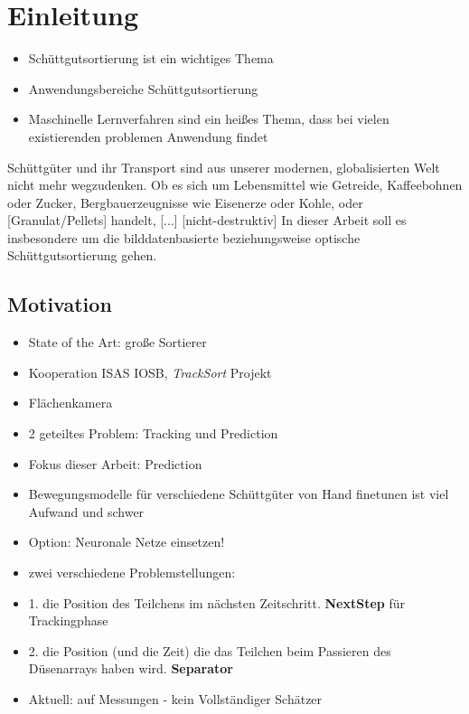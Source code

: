\chapter{Einleitung}

\begin{itemize}
    \item Schüttgutsortierung ist ein wichtiges Thema 
    \item Anwendungsbereiche Schüttgutsortierung
    \item Maschinelle Lernverfahren sind ein heißes Thema, dass bei vielen existierenden problemen Anwendung findet
\end{itemize}

Schüttgüter und ihr Transport sind aus unserer modernen, globalisierten Welt nicht mehr wegzudenken.
Ob es sich um Lebensmittel wie Getreide, Kaffeebohnen oder Zucker, Bergbauerzeugnisse wie Eisenerze oder Kohle, oder [Granulat/Pellets] handelt, 
[...]
[nicht-destruktiv]
In dieser Arbeit soll es insbesondere um die bilddatenbasierte beziehungsweise optische Schüttgutsortierung gehen.




\section{Motivation}

\color{blue}
\begin{itemize}
    \item State of the Art: große Sortierer 
    \item Kooperation ISAS IOSB, \textit{TrackSort} Projekt 
    \item Flächenkamera
    \item 2 geteiltes Problem: Tracking und Prediction
    \item Fokus dieser Arbeit: Prediction
    \item Bewegungsmodelle für verschiedene Schüttgüter von Hand finetunen ist viel Aufwand und schwer
    \item Option: Neuronale Netze einsetzen! 
    \item zwei verschiedene Problemstellungen:
    \item 1. die Position des Teilchens im nächsten Zeitschritt. \textbf{NextStep} für Trackingphase
    \item 2. die Position (und die Zeit) die das Teilchen beim Passieren des Düsenarrays haben wird. \textbf{Separator}
    \item Aktuell: auf Messungen - kein Vollständiger Schätzer
\end{itemize}
\color{black}

